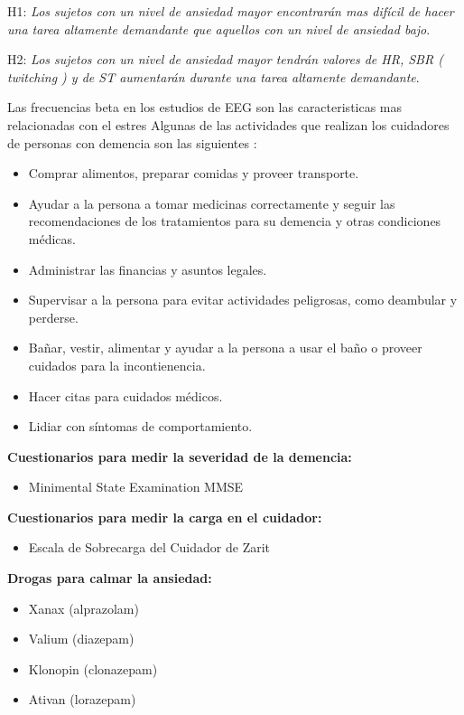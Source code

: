 \documentclass[letterpaper,12pt]{cicese}
\begin{document}
		H1: \textit{Los sujetos con un nivel de ansiedad mayor encontrar\'an mas dif\'icil de hacer una tarea altamente demandante que aquellos con un nivel de ansiedad bajo}.
		

		H2: \textit{Los sujetos con un nivel de ansiedad mayor tendr\'an valores de HR, SBR ( twitching ) y  de ST aumentar\'an durante una tarea altamente demandante}.
		\newpage
		
		Las frecuencias beta en los estudios de EEG son las caracteristicas mas relacionadas con el estres \citep{Sharma20121287}
		Algunas de las actividades que realizan los cuidadores de personas con demencia son las siguientes \citep{tagkey2008110}: 
		\begin{itemize}
			\item Comprar alimentos, preparar comidas y proveer transporte.
			\item Ayudar a la persona a tomar medicinas correctamente y seguir las recomendaciones de los tratamientos para su demencia y otras condiciones m\'edicas.
			\item Administrar las financias y asuntos legales.
			\item Supervisar a la persona para evitar actividades peligrosas, como deambular y perderse.	
			\item Ba\~nar, vestir, alimentar y ayudar a la persona a usar el ba\~no o proveer cuidados para la incontienencia.
			\item Hacer citas para cuidados m\'edicos.
			\item Lidiar con s\'intomas de comportamiento.

		\end{itemize}
		\textbf{Cuestionarios para medir la severidad de la demencia:}
		\begin{itemize}

			\item Minimental State Examination MMSE

		\end{itemize}
		\textbf{Cuestionarios para medir la carga en el cuidador:}
		\begin{itemize}

			\item Escala de Sobrecarga del Cuidador de Zarit

		\end{itemize}
		\textbf{Drogas para calmar la ansiedad:}
		\begin{itemize}
			\item Xanax (alprazolam)
			\item Valium (diazepam)
			\item Klonopin (clonazepam)
			\item Ativan (lorazepam)
		\end{itemize}
\end{document}
